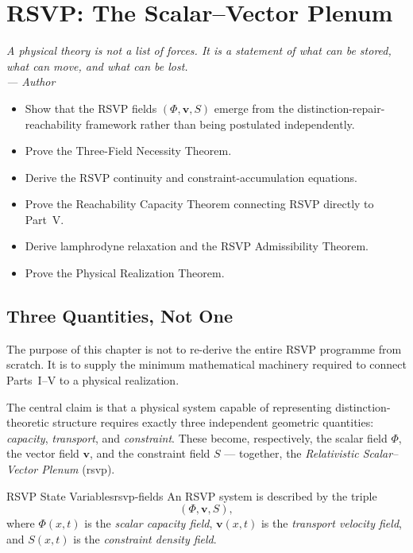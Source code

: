 \documentclass[12pt,twoside,openright]{book}
\newenvironment{epigraph}[2]{%
  \vspace{1em}\begin{flushright}
  \begin{minipage}{0.72\textwidth}
  \itshape\small #1\\[0.4em]
  \upshape\footnotesize\sffamily\color{DistGray}--- #2
  \end{minipage}\end{flushright}\vspace{1.5em}}{}
\newenvironment{objectives}{%
  \begin{tcolorbox}[colback=DistBlue!5,colframe=DistBlue,
    title={\faCheckCircle\enspace Learning Objectives},
    fonttitle=\sffamily\bfseries\color{white},
    attach boxed title to top left={yshift=-2mm,xshift=4mm},
    boxed title style={colback=DistBlue},breakable]
  \begin{itemize}[leftmargin=*,nosep]}{%
  \end{itemize}\end{tcolorbox}\vspace{1em}}
\begin{document}
\chapter{RSVP: The Scalar--Vector Plenum}
\label{ch:rsvp}

\begin{epigraph}{%
  A physical theory is not a list of forces. It is a
  statement of what can be stored, what can move, and
  what can be lost.}%
  {Author}
\end{epigraph}

\begin{objectives}
  \item Show that the RSVP fields $(\Phi,\mathbf{v},S)$ emerge
        from the distinction-repair-reachability framework
        rather than being postulated independently.
  \item Prove the Three-Field Necessity Theorem.
  \item Derive the RSVP continuity and constraint-accumulation
        equations.
  \item Prove the Reachability Capacity Theorem connecting
        RSVP directly to Part~V.
  \item Derive lamphrodyne relaxation and the RSVP
        Admissibility Theorem.
  \item Prove the Physical Realization Theorem.
\end{objectives}

\section{Three Quantities, Not One}
\label{sec:ch16-three}

The purpose of this chapter is not to re-derive the entire
RSVP programme from scratch. It is to supply the minimum
mathematical machinery required to connect
Parts~I--V to a physical realization.

The central claim is that a physical system capable of
representing distinction-theoretic structure requires
exactly three independent geometric quantities:
\emph{capacity}, \emph{transport}, and \emph{constraint}.
These become, respectively, the scalar field $\Phi$, the
vector field $\mathbf{v}$, and the constraint field $S$ —
together, the \emph{Relativistic Scalar--Vector Plenum}
(\gls{rsvp}).

\begin{definition}{RSVP State Variables}{rsvp-fields}
  An RSVP system is described by the triple
  \[
    (\Phi, \mathbf{v}, S),
  \]
  where $\Phi(x,t)$ is the \emph{scalar capacity field},
  $\mathbf{v}(x,t)$ is the \emph{transport velocity field},
  and $S(x,t)$ is the \emph{constraint density field}.
\end{definition}
\end{document}
